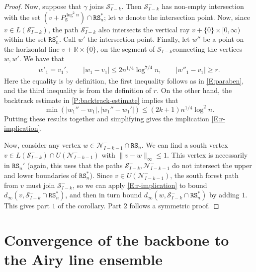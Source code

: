 \documentclass[11pt,twoside]{amsart}
\theoremstyle{plain}
\numberwithin{quest}{section}
\theoremstyle{remark}
\numberwithin{rem}{section}
\theoremstyle{definition}
\newcommand{\R}{\mathbb{R}}
\newcommand{\cS}{\mathcal{S}}
\newcommand{\cN}{\mathcal{N}}
\renewcommand{\tt}[1]{{\mathtt{#1}}}
\begin{document}
\begin{proof}
Now, suppose that $\gamma$ joins $\cS_{I-k}^-$. Then $\cS_{I-k}^-$ has non-empty intersection with the set $(v + P_\tt{S}^{\log^2 n}) \cap \tt{RS}_n^*$; let $w$ denote the intersection point. Now, since $v \in L(\cS_{I-k}^-)$, the path $\cS_{I-k}^-$ also intersects the vertical ray $v + \{0\} \times [0, \infty)$ within the set $\tt{RS}_n^*$. Call $w'$ the intersection point. Finally, let $w''$ be a point on the horizontal line $v + \R \times \{0\}$, on the segment of $\cS_{I-k}^-$connecting the vertices $w, w'$. We have that
\begin{align*}
w'_1 = v_1', \qquad |w_1 - v_1| \le 2 n^{1/4} \log^{7/4} n, \qquad |w''_1 - v_1| \ge r.
\end{align*}
Here the equality is by definition, the first inequality follows as in \eqref{E:paraben}, and the third inequality is from the definition of $r$. 
On the other hand, the backtrack estimate in \cref{P:backtrack-estimate} implies that
$$
\min(|w_1'' - w_1|, |w_1'' - w_1'|) \le (2k + 1) n^{1/4} \log^{2} n.
$$
Putting these results together and simplifying gives the implication \eqref{E:r-implication}.

Now, consider any vertex $w \in \cN_{I-k-1}^- \cap \tt{RS}_n$. We can find a south vertex $v \in  L(\cS_{I-k}^-) \cap U(\cN_{I-k - 1}^-)$ with $\|v - w\|_\infty \le 1$. This vertex is necessarily in $\tt{RS}_n'$ (again, this uses that the paths $\cS_{I-k}^-, \cN_{I-k - 1}^-$ do not intersect the upper and lower boundaries of $\tt{RS}_n^*$). Since $v \in U(\cN_{I-k - 1}^-)$, the south forest path from $v$ must join $\cS_{I-k}^-$, so we can apply \eqref{E:r-implication} to bound $d_\infty(v, \cS_{I-k}^- \cap \tt{RS}_n^*)$, and then in turn bound $d_\infty(w, \cS_{I-k}^- \cap \tt{RS}_n^*)$ by adding $1$. This gives part $1$ of the corollary. Part $2$ follows a symmetric proof.
\end{proof}

	
	\section{Convergence of the backbone to the Airy line ensemble}
    \label{S:cvg-airy}
	
\end{document}
